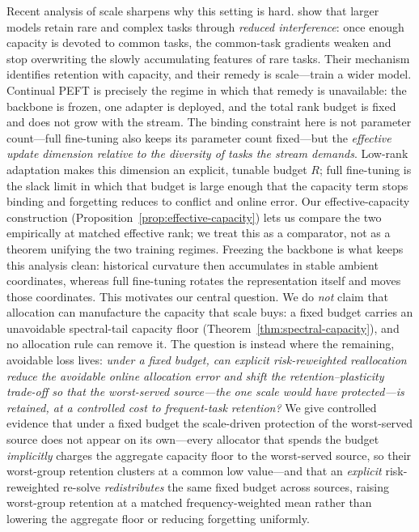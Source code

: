 Recent analysis of scale sharpens why this setting is hard. \citet{huang2026larger}
show that larger models retain rare and complex tasks through \emph{reduced
interference}: once enough capacity is devoted to common tasks, the common-task
gradients weaken and stop overwriting the slowly accumulating features of rare
tasks. Their mechanism identifies retention with capacity, and their remedy is
scale---train a wider model. Continual PEFT is precisely the regime in which
that remedy is unavailable: the backbone is frozen, one adapter is deployed, and
the total rank budget is fixed and does not grow with the stream. The binding
constraint here is not parameter count---full fine-tuning also keeps its
parameter count fixed---but the \emph{effective update dimension relative to the
diversity of tasks the stream demands}. Low-rank adaptation makes this dimension
an explicit, tunable budget $R$; full fine-tuning is the slack limit in which
that budget is large enough that the capacity term stops binding and forgetting
reduces to conflict and online error. Our effective-capacity construction
(Proposition~\ref{prop:effective-capacity}) lets us compare the two empirically
at matched effective rank; we treat this as a comparator, not as a theorem
unifying the two training regimes.
Freezing the backbone is what keeps this analysis clean: historical curvature
then accumulates in stable ambient coordinates, whereas full fine-tuning rotates
the representation itself and moves those coordinates. This motivates
our central question. We do \emph{not} claim that allocation can manufacture the
capacity that scale buys: a fixed budget carries an unavoidable spectral-tail
capacity floor (Theorem~\ref{thm:spectral-capacity}), and no allocation rule can
remove it. The question is instead where the remaining, avoidable loss lives:
\emph{under a fixed budget, can explicit risk-reweighted reallocation reduce the
avoidable online allocation error and shift the retention--plasticity trade-off
so that the worst-served source---the one scale would have protected---is
retained, at a controlled cost to frequent-task retention?} We give controlled evidence that
under a fixed budget the scale-driven protection of the worst-served source does
not appear on its own---every allocator that spends the budget \emph{implicitly}
charges the aggregate capacity floor to the worst-served source, so their
worst-group retention clusters at a common low value---and that an
\emph{explicit} risk-reweighted re-solve \emph{redistributes} the same fixed
budget across sources, raising worst-group retention at a matched
frequency-weighted mean rather than lowering the aggregate floor or reducing
forgetting uniformly.

